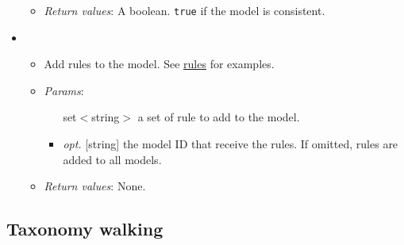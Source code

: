 \begin{itemize}
\begin{itemize}
\item  \emph{Return values}: A boolean. \texttt{true} if the model is consistent.
\end{itemize}

\item  {}
\begin{itemize}
\item  Add rules to the model. See \hyperref[a4f86f7bfc24194b276c22e0ef158197]{rules} for examples.
\item  \emph{Params}:
\begin{itemize}
\item  [set$<$string$>$] a set of rule to add to the model.
\item  \emph{opt.} [string] the model ID that receive the rules. If omitted, rules are added to all models. 
\end{itemize}

\item  \emph{Return values}: None.
\end{itemize}

\end{itemize}

\subsection{Taxonomy walking}



